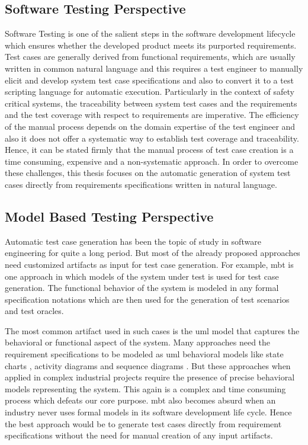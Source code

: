\subsection{Software Testing Perspective}
Software Testing is one of the salient steps in the software development lifecycle which ensures whether the developed product meets its purported requirements. Test cases are generally derived from functional requirements, which are usually written in common natural language and this requires a test engineer to manually elicit and develop system test case specifications and also to convert it to a test scripting language for automatic execution. Particularly in the context of safety critical systems, the traceability between system test cases and the requirements and the test coverage with respect to requirements are imperative. The efficiency of the manual process depends on the domain expertise of the test engineer and also it does not offer a systematic way to establish test coverage and traceability. Hence, it can be stated firmly that the manual process of test case creation is a time consuming, expensive and a non-systematic approach. In order to overcome these challenges, this thesis focuses on the automatic generation of system test cases directly from requirements specifications written in natural language.

\subsection{Model Based Testing Perspective}
Automatic test case generation has been the topic of study in software engineering for quite a long period. But most of the already proposed approaches need customized artifacts as input for test case generation. For example, \gls{mbt} is one approach in which models of the system under test is used for test case generation.  The functional behavior of the system is modeled in any formal specification notations \cite{carvalho2013test} which are then used for the generation of test scenarios and test oracles.

The most common artifact used in such cases is the \gls{uml} model that captures the behavioral or functional aspect of the system. Many approaches need the requirement specifications to be modeled as \gls{uml} behavioral models like state charts \cite{ryser1999scenario}, activity diagrams \cite{linzhang2004generating} and sequence diagrams \cite{nebut2006automatic}.  But these approaches when applied in complex industrial projects require the presence of precise behavioral models representing the system. This again is a complex and time consuming process which defeats our core purpose. \gls{mbt} also becomes absurd when an industry never uses formal models in its software development life cycle.  Hence the best approach would be to generate test cases directly from requirement specifications without the need for manual creation of any input artifacts.
